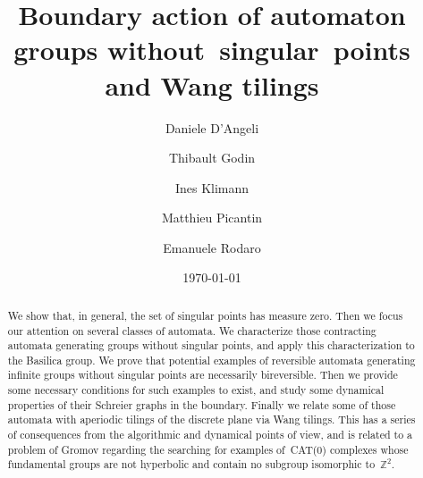 \documentclass{amsart}
\title[Boundary action of autom. groups w/o singular points \& Wang tilings~~~~]
{Boundary action of automaton groups without~singular~points and Wang tilings}
\date{\today}
\begin{document}
 

\author[D. D'Angeli]	{Daniele D'Angeli}
\address{Institut f\"{u}r Diskrete Mathematik\\
		Technische Universit\"{a}t Graz\\
		Steyrergasse 30, 8010 Graz, Austria.}

\author[Th. Godin]	{Thibault Godin}\address{IRIF, UMR 8243 Universit\'e Paris Diderot \& CNRS\\
		B\^atiment Sophie Germain\\
		75205 Paris Cedex 13, France.}

\author[I. Klimann]	{Ines Klimann}
\address{IRIF, UMR 8243 Universit\'e Paris Diderot \& CNRS\\
		B\^atiment Sophie Germain\\
		75205 Paris Cedex 13, France.}

\author[M. Picantin]	{Matthieu Picantin}
\address{IRIF, UMR 8243 Universit\'e Paris Diderot \& CNRS\\
		B\^atiment Sophie Germain\\
		75205 Paris Cedex 13, France.}

\author[E. Rodaro]	{Emanuele Rodaro}
\address{Department of mathematics, Politecnico di Milano\\
		Piazza Leonardo da Vinci, 32, 20133 Milano, Italy}

\maketitle

\begin{abstract}
\vspace*{-18pt}
We show that, in general, the set of singular points has measure zero. Then we focus our attention on several classes of automata. 
We characterize those contracting automata generating groups without singular points, 
and apply this characterization to the Basilica group.
We prove that potential examples of reversible automata generating infinite groups without singular points are necessarily bireversible.
Then we provide some necessary conditions for such examples to exist, and 
study some dynamical properties of their Schreier graphs in the boundary.
Finally we relate some of those automata with aperiodic tilings of the discrete plane via Wang tilings. This 
has a series of consequences from the algorithmic and dynamical points of view, and 
is related to a problem of Gromov regarding the searching for examples of~CAT(0) complexes
whose fundamental groups are not hyperbolic and contain no subgroup isomorphic to~$\mathbb{Z}^{2}$.
\end{abstract}
\end{document}

